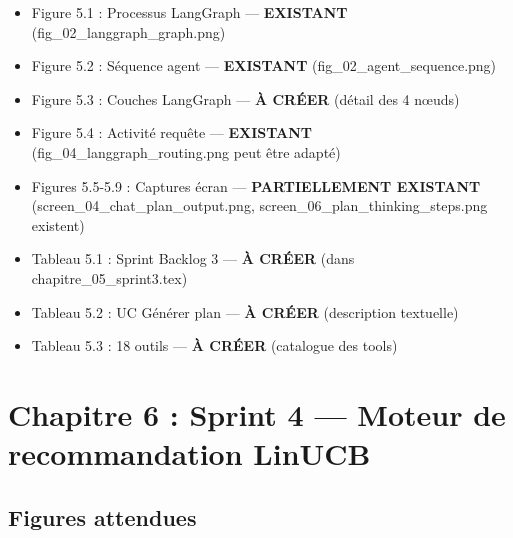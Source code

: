 \documentclass[12pt,a4paper]{article}
\begin{document}
\begin{itemize}
    \item[\textcolor{green}{\checkmark}] Figure 5.1 : Processus LangGraph — \textbf{EXISTANT} (fig\_02\_langgraph\_graph.png)
    \item[\textcolor{green}{\checkmark}] Figure 5.2 : Séquence agent — \textbf{EXISTANT} (fig\_02\_agent\_sequence.png)
    \item[\textcolor{green}{\checkmark}] Figure 5.3 : Couches LangGraph — \textbf{À CRÉER} (détail des 4 nœuds)
    \item[\textcolor{green}{\checkmark}] Figure 5.4 : Activité requête — \textbf{EXISTANT} (fig\_04\_langgraph\_routing.png peut être adapté)
    \item[\textcolor{orange}{!}] Figures 5.5-5.9 : Captures écran — \textbf{PARTIELLEMENT EXISTANT} (screen\_04\_chat\_plan\_output.png, screen\_06\_plan\_thinking\_steps.png existent)
    
    \item[\textcolor{green}{\checkmark}] Tableau 5.1 : Sprint Backlog 3 — \textbf{À CRÉER} (dans chapitre\_05\_sprint3.tex)
    \item[\textcolor{green}{\checkmark}] Tableau 5.2 : UC Générer plan — \textbf{À CRÉER} (description textuelle)
    \item[\textcolor{green}{\checkmark}] Tableau 5.3 : 18 outils — \textbf{À CRÉER} (catalogue des tools)
\end{itemize}


\section{Chapitre 6 : Sprint 4 — Moteur de recommandation LinUCB}

\subsection*{Figures attendues}
\end{document}
